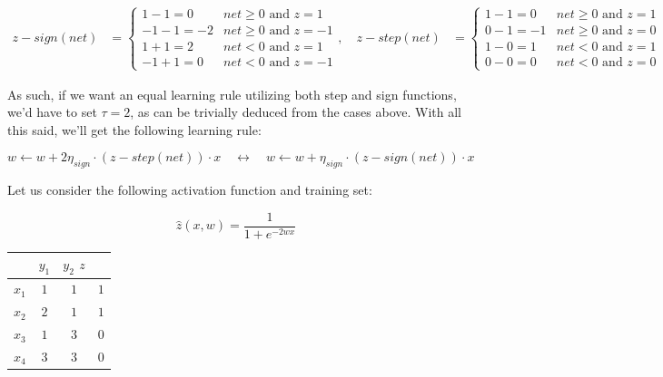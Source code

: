 \documentclass[12pt]{article}
\begin{document}
\begin{enumerate}[leftmargin=\labelsep]
\begin{enumerate}
{          \begin{align*}
            z - sign(net) & = \begin{cases}
                                1 - 1 = 0  & net \geq 0 \text { and } z = 1  \\
                                -1 -1 = -2 & net \geq 0 \text { and } z = -1 \\
                                1 + 1 = 2  & net < 0 \text { and } z = 1     \\
                                -1 + 1 = 0 & net < 0 \text { and } z = -1
                              \end{cases}, \quad
            z - step(net) & = \begin{cases}
                                1 - 1 = 0  & net \geq 0 \text { and } z = 1 \\
                                0 - 1 = -1 & net \geq 0 \text { and } z = 0 \\
                                1 - 0 = 1  & net < 0 \text { and } z = 1    \\
                                0 - 0 = 0  & net < 0 \text { and } z = 0
                              \end{cases}
          \end{align*}

          As such, if we want an equal learning rule utilizing both step and sign
          functions, we'd have to set $\tau = 2$, as can be trivially deduced from
          the cases above. With all this said, we'll get the following learning rule:

          $$
            w \leftarrow w + 2 \eta_{sign} \cdot (z - step(net)) \cdot x \quad \leftrightarrow \quad
            w \leftarrow w + \eta_{sign} \cdot (z - sign(net)) \cdot x
          $$
          }
  \end{enumerate}

  \begin{tcolorbox}[enhanced jigsaw,colback=bg,boxrule=0pt,arc=1pt,halign=center]
    \item Let us consider the following activation function and training set:

    \begin{equation*}
      \hat{z}(x, w) = \frac{1}{1 + e^{-2 w x}}
    \end{equation*}

    \begin{table}[H]
      \centering
      \begin{tabular}{c|c|c|c}
              & $y_1$ & $y_2$ $z$       \\ \hline
        $x_1$ & $1$   & $1$       & $1$ \\
        $x_2$ & $2$   & $1$       & $1$ \\
        $x_3$ & $1$   & $3$       & $0$ \\
        $x_4$ & $3$   & $3$       & $0$
      \end{tabular}
    \end{table}


\end{tcolorbox}
\end{enumerate}
\end{document}
